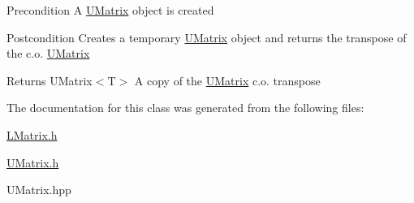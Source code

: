 \begin{DoxyPrecond}{Precondition}
A \mbox{\hyperlink{class_u_matrix}{U\+Matrix}} object is created 
\end{DoxyPrecond}
\begin{DoxyPostcond}{Postcondition}
Creates a temporary \mbox{\hyperlink{class_u_matrix}{U\+Matrix}} object and returns the transpose of the c.\+o. \mbox{\hyperlink{class_u_matrix}{U\+Matrix}} 
\end{DoxyPostcond}
\begin{DoxyReturn}{Returns}
U\+Matrix$<$\+T$>$ A copy of the \mbox{\hyperlink{class_u_matrix}{U\+Matrix}} c.\+o. transpose 
\end{DoxyReturn}


The documentation for this class was generated from the following files\+:\begin{DoxyCompactItemize}
\item 
\mbox{\hyperlink{_l_matrix_8h}{L\+Matrix.\+h}}\item 
\mbox{\hyperlink{_u_matrix_8h}{U\+Matrix.\+h}}\item 
U\+Matrix.\+hpp\end{DoxyCompactItemize}
